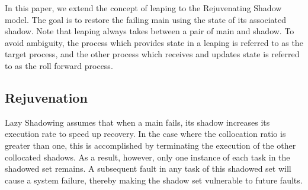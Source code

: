 In this paper, we extend the concept of leaping to the  Rejuvenating Shadow model. The goal is to restore the failing main using the state of its associated shadow. Note that leaping always takes between a pair of main and shadow. To avoid ambiguity, the process which provides state in a leaping is referred to as the target process, and the other process which receives and updates state is referred to as the roll forward process. 


\subsection{Rejuvenation}


Lazy Shadowing assumes that when a main fails, its shadow increases its execution rate to speed up recovery. In the case where the collocation ratio is greater than one, this is accomplished by terminating the execution of the other collocated shadows. As a result, however, only one instance of each task in the shadowed set remains. A subsequent fault in any task of this shadowed set will cause a system failure, thereby making the shadow set vulnerable to future faults.



